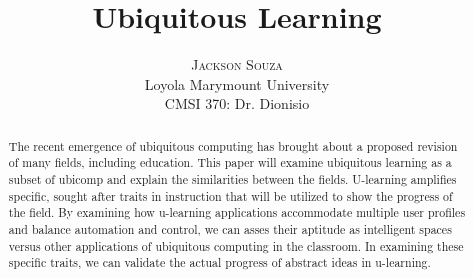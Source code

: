 \documentclass[twoside]{article}
\title{\vspace{-15mm}\fontsize{24pt}{10pt}\selectfont\textbf{Ubiquitous Learning}} %
\author{
\large
\textsc{Jackson Souza}\\[2mm] %
\normalsize Loyola Marymount University \\ %
\normalsize CMSI 370: Dr. Dionisio \\ %
\vspace{-5mm}
}
\date{}
\begin{document}
\maketitle %

\thispagestyle{fancy} %


\begin{abstract}

\noindent  The recent emergence of ubiquitous computing has brought about a proposed revision of many fields, including education. This paper will examine ubiquitous learning as a subset of ubicomp and explain the similarities between the fields. U-learning amplifies specific, sought after traits in instruction that will be utilized to show the progress of the field. By examining how u-learning applications accommodate multiple user profiles and balance automation and control, we can asses their aptitude as intelligent spaces versus other applications of ubiquitous computing in the classroom. In examining these specific traits, we can validate the actual progress of abstract ideas in u-learning.

\end{abstract}

\end{document}
